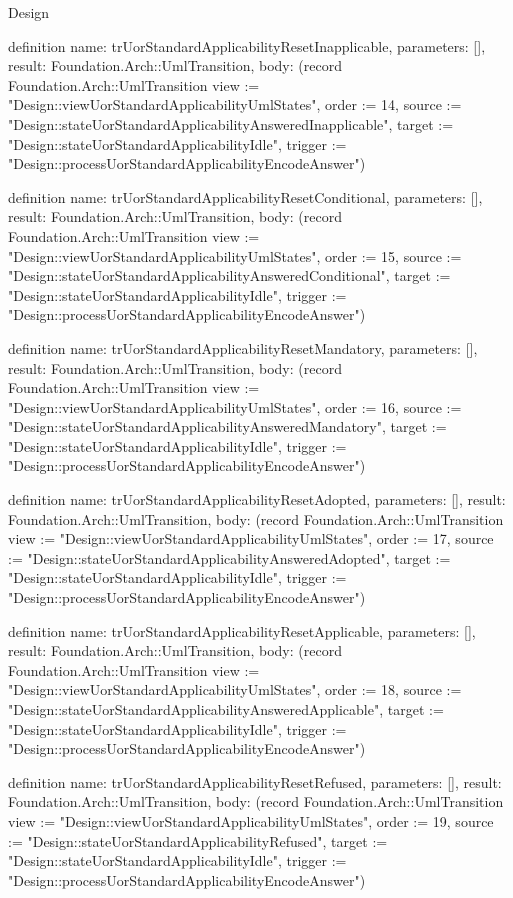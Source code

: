 \begin{lexlean}{Design}
\begin{semanticmodule}
definition{
  name: trUorStandardApplicabilityResetInapplicable,
  parameters: [],
  result: Foundation.Arch::UmlTransition,
  body: (record Foundation.Arch::UmlTransition {view := "Design::viewUorStandardApplicabilityUmlStates", order := 14, source := "Design::stateUorStandardApplicabilityAnsweredInapplicable", target := "Design::stateUorStandardApplicabilityIdle", trigger := "Design::processUorStandardApplicabilityEncodeAnswer"})
}

definition{
  name: trUorStandardApplicabilityResetConditional,
  parameters: [],
  result: Foundation.Arch::UmlTransition,
  body: (record Foundation.Arch::UmlTransition {view := "Design::viewUorStandardApplicabilityUmlStates", order := 15, source := "Design::stateUorStandardApplicabilityAnsweredConditional", target := "Design::stateUorStandardApplicabilityIdle", trigger := "Design::processUorStandardApplicabilityEncodeAnswer"})
}

definition{
  name: trUorStandardApplicabilityResetMandatory,
  parameters: [],
  result: Foundation.Arch::UmlTransition,
  body: (record Foundation.Arch::UmlTransition {view := "Design::viewUorStandardApplicabilityUmlStates", order := 16, source := "Design::stateUorStandardApplicabilityAnsweredMandatory", target := "Design::stateUorStandardApplicabilityIdle", trigger := "Design::processUorStandardApplicabilityEncodeAnswer"})
}

definition{
  name: trUorStandardApplicabilityResetAdopted,
  parameters: [],
  result: Foundation.Arch::UmlTransition,
  body: (record Foundation.Arch::UmlTransition {view := "Design::viewUorStandardApplicabilityUmlStates", order := 17, source := "Design::stateUorStandardApplicabilityAnsweredAdopted", target := "Design::stateUorStandardApplicabilityIdle", trigger := "Design::processUorStandardApplicabilityEncodeAnswer"})
}

definition{
  name: trUorStandardApplicabilityResetApplicable,
  parameters: [],
  result: Foundation.Arch::UmlTransition,
  body: (record Foundation.Arch::UmlTransition {view := "Design::viewUorStandardApplicabilityUmlStates", order := 18, source := "Design::stateUorStandardApplicabilityAnsweredApplicable", target := "Design::stateUorStandardApplicabilityIdle", trigger := "Design::processUorStandardApplicabilityEncodeAnswer"})
}

definition{
  name: trUorStandardApplicabilityResetRefused,
  parameters: [],
  result: Foundation.Arch::UmlTransition,
  body: (record Foundation.Arch::UmlTransition {view := "Design::viewUorStandardApplicabilityUmlStates", order := 19, source := "Design::stateUorStandardApplicabilityRefused", target := "Design::stateUorStandardApplicabilityIdle", trigger := "Design::processUorStandardApplicabilityEncodeAnswer"})
}


\end{semanticmodule}
\end{lexlean}
